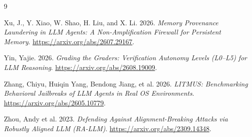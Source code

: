 \documentclass[11pt]{article}
\begin{document}
\begin{thebibliography}{9}

Xu, J., Y. Xiao, W. Shao, H. Liu, and X. Li. 2026. \emph{Memory Provenance Laundering in LLM Agents: A Non-Amplification Firewall for Persistent Memory}. \url{https://arxiv.org/abs/2607.29167}.


Yin, Yajie. 2026. \emph{Grading the Graders: Verification Autonomy Levels (L0--L5) for LLM Reasoning}. \url{https://arxiv.org/abs/2608.19009}.


Zhang, Chiyu, Huiqin Yang, Bendong Jiang, et al. 2026. \emph{LITMUS: Benchmarking Behavioral Jailbreaks of LLM Agents in Real OS Environments}. \url{https://arxiv.org/abs/2605.10779}.


{Zhou, Andy et al.} 2023. \emph{Defending Against Alignment-Breaking Attacks via Robustly Aligned LLM (RA-LLM)}. \url{https://arxiv.org/abs/2309.14348}.

\end{thebibliography}
\end{document}
